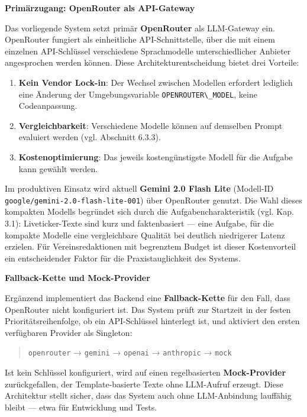 \textbf{Primärzugang: OpenRouter als API-Gateway}

Das vorliegende System setzt primär \textbf{OpenRouter} als LLM-Gateway
ein. OpenRouter fungiert als einheitliche API-Schnittstelle, über die
mit einem einzelnen API-Schlüssel verschiedene Sprachmodelle
unterschiedlicher Anbieter angesprochen werden können. Diese
Architekturentscheidung bietet drei Vorteile:

\begin{enumerate}
\def\labelenumi{\arabic{enumi}.}
\tightlist
\item
  \textbf{Kein Vendor Lock-in}: Der Wechsel zwischen Modellen erfordert
  lediglich eine Änderung der Umgebungsvariable
  \passthrough{\lstinline!OPENROUTER\_MODEL!}, keine Codeanpassung.
\item
  \textbf{Vergleichbarkeit}: Verschiedene Modelle können auf demselben
  Prompt evaluiert werden (vgl. Abschnitt 6.3.3).
\item
  \textbf{Kostenoptimierung}: Das jeweils kostengünstigste Modell für
  die Aufgabe kann gewählt werden.
\end{enumerate}

Im produktiven Einsatz wird aktuell \textbf{Gemini 2.0 Flash Lite}
(Modell-ID \passthrough{\lstinline!google/gemini-2.0-flash-lite-001!})
über OpenRouter genutzt. Die Wahl dieses kompakten Modells begründet
sich durch die Aufgabencharakteristik (vgl. Kap. 3.1): Liveticker-Texte
sind kurz und faktenbasiert --- eine Aufgabe, für die kompakte Modelle
eine vergleichbare Qualität bei deutlich niedrigerer Latenz erzielen.
Für Vereinsredaktionen mit begrenztem Budget ist dieser Kostenvorteil
ein entscheidender Faktor für die Praxistauglichkeit des Systems.

\textbf{Fallback-Kette und Mock-Provider}

Ergänzend implementiert das Backend eine \textbf{Fallback-Kette} für den
Fall, dass OpenRouter nicht konfiguriert ist. Das System prüft zur
Startzeit in der festen Prioritätsreihenfolge, ob ein API-Schlüssel
hinterlegt ist, und aktiviert den ersten verfügbaren Provider als
Singleton:

\begin{quote}
\passthrough{\lstinline!openrouter!} → \passthrough{\lstinline!gemini!}
→ \passthrough{\lstinline!openai!} → \passthrough{\lstinline!anthropic!}
→ \passthrough{\lstinline!mock!}
\end{quote}

Ist kein Schlüssel konfiguriert, wird auf einen regelbasierten
\textbf{Mock-Provider} zurückgefallen, der Template-basierte Texte ohne
LLM-Aufruf erzeugt. Diese Architektur stellt sicher, dass das System
auch ohne LLM-Anbindung lauffähig bleibt --- etwa für Entwicklung und
Tests.

